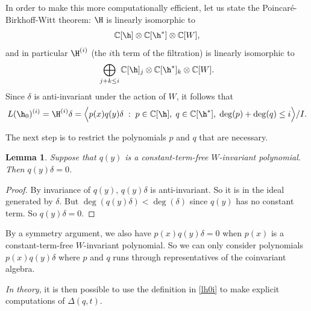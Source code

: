 \documentclass[11pt]{article}
\newtheorem{lemm}[theo]{Lemma}
\theoremstyle{definition}
\begin{document}
In order to make this more computationally efficient, let us state the Poincaré-Birkhoff-Witt theorem: $\H$ is linearly isomorphic to 
\[
    \mathbb{C}[\h] \otimes
    \mathbb{C}[\h^*] \otimes
    \mathbb{C}[W],
\]
and in particular $\H^{(i)}$ (the $i$th term of the filtration) is linearly isomorphic to 
\[
    \bigoplus_{j+k\leq i}
    \mathbb{C}[\h]_j \otimes
    \mathbb{C}[\h^*]_k \otimes
    \mathbb{C}[W].
\]
Since $\delta$ is anti-invariant under the action of $W$, it follows that 
\begin{equation} \label{lh0i}
    L(\h_0)^{(i)}
        =
    \H^{(i)} \delta
        =
    \Big\langle
        p(x)q(y)\delta \;:\;
        p\in \mathbb{C}[\h],\; q\in \mathbb{C}[\h^*], \; \deg(p)+\deg(q)\leq i
    \Big\rangle /I.
\end{equation}

The next step is to restrict the polynomials $p$ and $q$ that are necessary. 

\begin{lemm}
    Suppose that $q(y)$ is a constant-term-free $W$-invariant polynomial.  Then $q(y)\delta = 0$.
\end{lemm}

\begin{proof}
    By invariance of $q(y)$,  $q(y)\delta$ is anti-invariant.  So it is in the ideal generated by $\delta$.  But $\deg( q(y)\delta ) < \deg(\delta)$ since $q(y)$ has no constant term.  So $q(y)\delta = 0$.    
\end{proof}

By a symmetry argument, we also have $p(x)q(y)\delta = 0$ when $p(x)$ is a constant-term-free $W$-invariant polynomial. So we can only consider polynomials $p(x)q(y)\delta$ where $p$ and $q$ runs through representatives of the coinvariant algebra.  

{\it In theory}, it is then possible to use the definition in \eqref{lh0i} to make explicit computations of $\varDelta(q,t)$.
\end{document}
